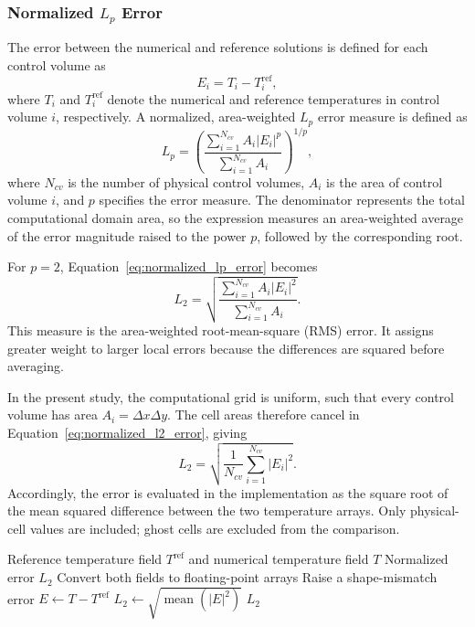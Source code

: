 \subsubsection{Normalized $L_p$ Error}

The error between the numerical and reference solutions is defined
for each control volume as
\begin{equation}
E_i = T_i - T_i^{\mathrm{ref}},
\end{equation}
where $T_i$ and $T_i^{\mathrm{ref}}$ denote the numerical and
reference temperatures in control volume $i$, respectively.
A normalized, area-weighted $L_p$ error measure is defined as
\begin{equation}
L_p =
\left(
\frac{
\displaystyle\sum_{i=1}^{N_{cv}}
A_i |E_i|^p
}{
\displaystyle\sum_{i=1}^{N_{cv}} A_i
}
\right)^{1/p},
\label{eq:normalized_lp_error}
\end{equation}
where $N_{cv}$ is the number of physical control volumes,
$A_i$ is the area of control volume $i$, and $p$ specifies the
error measure. The denominator represents the total computational
domain area, so the expression measures an area-weighted average
of the error magnitude raised to the power $p$, followed by the
corresponding root.

For $p=2$, Equation~\eqref{eq:normalized_lp_error} becomes
\begin{equation}
L_2 =
\sqrt{
\frac{
\displaystyle\sum_{i=1}^{N_{cv}} A_i |E_i|^2
}{
\displaystyle\sum_{i=1}^{N_{cv}} A_i
}
}.
\label{eq:normalized_l2_error}
\end{equation}
This measure is the area-weighted root-mean-square (RMS) error.
It assigns greater weight to larger local errors because the
differences are squared before averaging.

In the present study, the computational grid is uniform, such
that every control volume has area $A_i=\Delta x\Delta y$.
The cell areas therefore cancel in
Equation~\eqref{eq:normalized_l2_error}, giving
\begin{equation}
L_2 =
\sqrt{
\frac{1}{N_{cv}}
\sum_{i=1}^{N_{cv}} |E_i|^2
}.
\label{eq:rms_error}
\end{equation}
Accordingly, the error is evaluated in the implementation as
the square root of the mean squared difference between the two
temperature arrays. Only physical-cell values are included;
ghost cells are excluded from the comparison.

\begin{algorithm}[H]
\caption{Normalized $L_2$ Error Evaluation}
\label{alg:l2_error}
\begin{algorithmic}[1]
\Require Reference temperature field $T^{\mathrm{ref}}$
and numerical temperature field $T$
\Ensure Normalized error $L_2$
\State Convert both fields to floating-point arrays
    \State Raise a shape-mismatch error
\EndIf
\State $E \gets T-T^{\mathrm{ref}}$
\State $L_2 \gets \sqrt{\operatorname{mean}(|E|^2)}$
\State \Return $L_2$
\end{algorithmic}
\end{algorithm}

